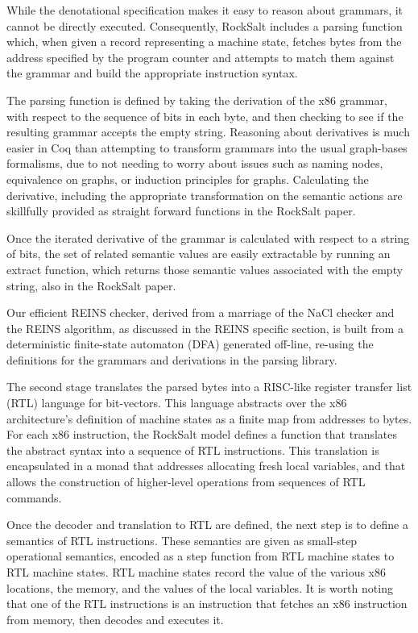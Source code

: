 \documentclass[conference]{IEEEtran}
\begin{document}
While the denotational specification makes it easy to reason about grammars, it cannot be directly executed.  
Consequently, RockSalt includes a parsing function which, when given a record representing a machine state, fetches bytes from the address specified by the program counter and attempts to match them against the grammar and build the appropriate instruction syntax.

The parsing function is defined by taking the derivation of the x86 grammar, with respect to the sequence of bits in each byte, and then checking to see if the resulting grammar accepts the empty string.  
Reasoning about derivatives is much easier in Coq than attempting to transform grammars into the usual graph-bases formalisms, due to not needing to worry about issues such as naming nodes, equivalence on graphs, or induction principles for graphs.  
Calculating the derivative, including the appropriate transformation on the semantic actions are skillfully provided as straight forward functions in the RockSalt paper\cite{MorrisettTTTG12}.
 
Once the iterated derivative of the grammar is calculated with respect to a string of bits, the set of related semantic values are easily extractable by running an extract function, which returns those semantic values associated with the empty string, also in the RockSalt paper\cite{MorrisettTTTG12}.

Our efficient REINS checker, derived from a marriage of the NaCl checker and the REINS algorithm, as discussed in the REINS specific section, is built from a deterministic finite-state automaton (DFA) generated off-line, re-using the definitions for the grammars and derivations in the parsing library.

The second stage translates the parsed bytes into a RISC-like register transfer list (RTL) language for bit-vectors.
This language abstracts over the x86 architecture's definition of machine states as a finite map from addresses to bytes.  
For each x86 instruction, the RockSalt model defines a function that translates the abstract syntax into a sequence of RTL instructions. 
This translation is encapsulated in a monad that addresses allocating fresh local variables, and that allows the construction of higher-level operations from sequences of RTL commands.  

Once the decoder and translation to RTL are defined, the next step is to define a semantics of RTL instructions.
These semantics are given as small-step operational semantics, encoded as a step function from RTL machine states to RTL machine states.
RTL machine states record the value of the various x86 locations, the memory, and the values of the local variables. It is worth noting that one of the RTL instructions is an instruction that fetches an x86 instruction from memory, then decodes and executes it.
\end{document}
